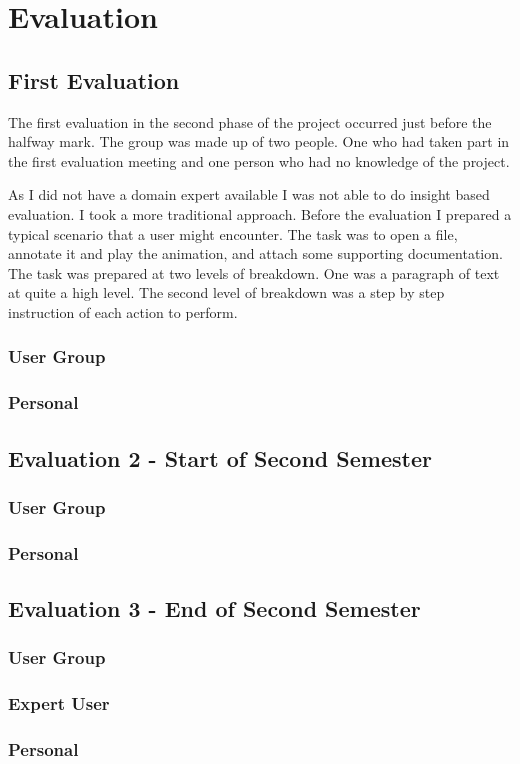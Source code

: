 \section{Evaluation}

\subsection{First Evaluation}

The first evaluation in the second phase of the project occurred just before the halfway mark.  The group was made up of two people.  One who had taken part in the first evaluation meeting and one person who had no knowledge of the project.

As I did not have a domain expert available I was not able to do insight based evaluation.  I took a more traditional approach.  Before the evaluation I prepared a typical scenario that a user might encounter.  The task was to open a file, annotate it and play the animation, and attach some supporting documentation.  The task was prepared at two levels of breakdown.  One was a paragraph of text at quite a high level.  The second level of breakdown was a step by step instruction of each action to perform.

\subsubsection{User Group}
\subsubsection{Personal}

\subsection{Evaluation 2 - Start of Second Semester}
\subsubsection{User Group}
\subsubsection{Personal}

\subsection{Evaluation 3 - End of Second Semester}
\subsubsection{User Group}
\subsubsection{Expert User}
\subsubsection{Personal}
